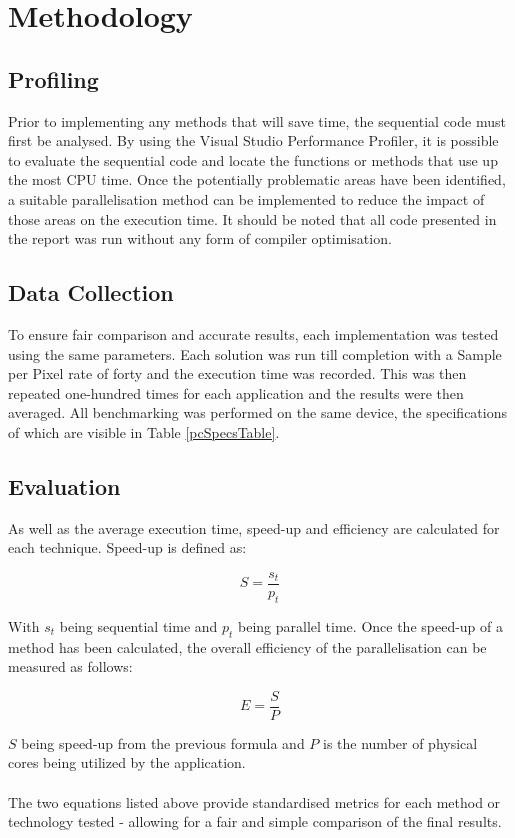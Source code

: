 \documentclass[journal,transmag]{IEEEtran}
\begin{document}
\section{Methodology}
		
	\subsection{Profiling}
		Prior to implementing any methods that will save time, the sequential code must first be analysed. By using the Visual Studio Performance Profiler, it is possible to evaluate the sequential code and locate the functions or methods that use up the most CPU time. Once the potentially problematic areas have been identified, a suitable parallelisation method can be implemented to reduce the impact of those areas on the execution time. It should be noted that all code presented in the report was run without any form of compiler optimisation.
		
	\subsection{Data Collection}
		To ensure fair comparison and accurate results, each implementation was tested using the same parameters. Each solution was run till completion with a Sample per Pixel rate of forty and the execution time was recorded. This was then repeated one-hundred times for each application and the results were then averaged. All benchmarking was performed on the same device, the specifications of which are visible in Table \ref{pcSpecsTable}. 
		
	\subsection{Evaluation}
		As well as the average execution time, speed-up and efficiency are calculated for each technique. Speed-up is defined as: 
		
		\[S=\frac{s_{t}}{p_{t}}\]
		
		\noindent With \(s_{t}\) being sequential time and \(p_{t}\) being parallel time.
		Once the speed-up of a method has been calculated, the overall efficiency of the parallelisation can be measured as follows:
		
		\[E = \frac{S}{P}\]
		
		\noindent \(S\) being speed-up from the previous formula and \(P\) is the number of physical cores being utilized by the application.
		\\\\The two equations listed above provide standardised metrics for each method or technology tested - allowing for a fair and simple comparison of the final results.
		
\end{document}
